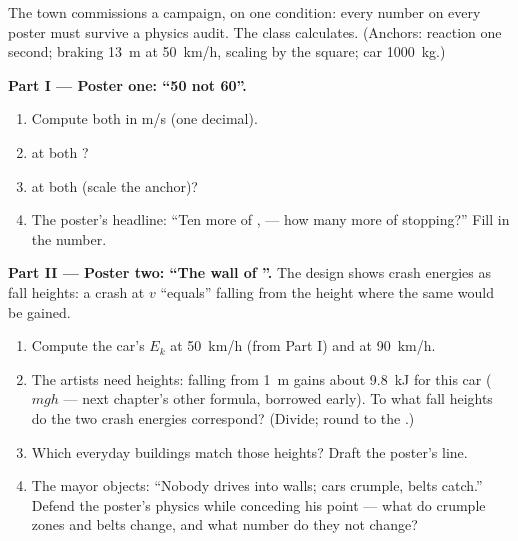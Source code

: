 \begin{problem}\label{pb:g9:kinetic-energy-safety:1}
The town commissions a campaign, on one condition: every
number on every poster must survive a physics audit. The
class calculates. (Anchors: reaction one second; braking
\qty{13}{m} at \qty{50}{km/h}, scaling by the square; car
 \qty{1000}{kg}.)

\medskip\noindent\textbf{Part I --- Poster one: ``50 not
60''.}
\begin{enumerate}
  \item Compute both  in \unit{m/s} (one decimal).
  \item {} at both ?
  \item {} at both (scale the anchor)?
  \item The poster's headline: ``Ten more  of ,
        --- how many more  of stopping?'' Fill in the
        number.
\end{enumerate}

\medskip\noindent\textbf{Part II --- Poster two: ``The wall
of ''.}
The design shows crash energies as fall heights: a crash at
 $v$ ``equals'' falling from the height where the same
 would be gained.
\begin{enumerate}[resume]
  \item Compute the car's $E_k$ at \qty{50}{km/h} (from
        Part I) and at \qty{90}{km/h}.
  \item The artists need heights: falling from \qty{1}{m}
        gains about \qty{9.8}{kJ} for this car ($m g h$ ---
        next chapter's other formula, borrowed early). To
        what fall heights do the two crash energies
        correspond? (Divide; round to the .)
  \item Which everyday buildings match those heights? Draft
        the poster's line.
  \item The mayor objects: ``Nobody drives into walls;
        cars crumple, belts catch.'' Defend the poster's
        physics while conceding his point --- what do
        crumple zones and belts change, and what number do
        they not change?
\end{enumerate}


\end{problem}
